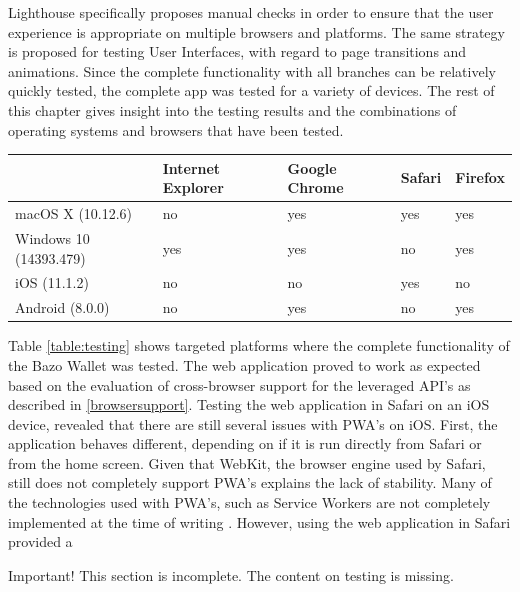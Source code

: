 Lighthouse specifically proposes manual checks in order to ensure that the user experience is appropriate on multiple browsers and platforms. The same strategy is proposed for testing User Interfaces, with regard to page transitions and animations. 
Since the complete functionality with all branches can be relatively quickly tested, the complete app was tested for a variety of devices. The rest of this chapter gives insight into the testing results and the combinations of operating systems and browsers that have been tested.


\begin{center}
    \begin{tabular}{ | l | l | l | l | p{3cm} |}
    \hline
      & Internet Explorer & Google Chrome & Safari & Firefox \\ \hline
    macOS X (10.12.6)  & no & yes & yes & yes \\ \hline
    Windows 10 (14393.479)  & yes & yes & no & yes \\ \hline    
    iOS (11.1.2)  & no & no & yes & no \\ \hline
    Android (8.0.0)  & no & yes & no & yes \\ \hline
    \end{tabular}
    \label{table:testing}
    \end{center}
Table \ref{table:testing} shows targeted platforms where the complete functionality of the Bazo Wallet was tested. The web application proved to work as expected based on the evaluation of cross-browser support for the leveraged API's as described in \ref{browsersupport}. Testing the web application in Safari on an iOS device, revealed that there are still several issues with PWA's on iOS. First, the application behaves different, depending on if it is run directly from Safari or from the home screen. Given that WebKit, the browser engine used by Safari, still does not completely support PWA's explains the lack of stability. Many of the technologies used with PWA's, such as Service Workers are not completely implemented at the time of writing \cite{webkitsw}. However, using the web application in Safari provided a 
 

\begin{bclogo}[logo=\bcattention, couleurBarre=red, noborder=true, 
               couleur=LightSalmon]{Important!}
This section is incomplete. The content on testing is missing.
\end{bclogo}
\newpage
